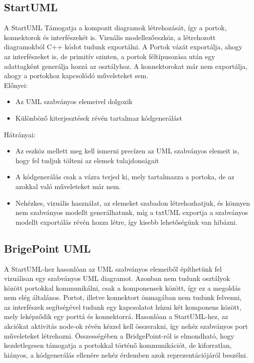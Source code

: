 \documentclass[a4paper,12pt]{report}
\begin{document}
\subsection{StartUML}
A StartUML  Támogatja a kompozit diagramok létrehozását, így a portok, konnektorok és interfészekét is. Vizuális modellezőeszköz, a létrehozott diagramokból C++ kódot tudunk exportálni. A Portok vázát exportálja, ahogy az interfészeket is, de primitív szinten, a portok féltípusozása után egy adattagként generálja hozzá az osztályhoz. A konnektorokat már nem exportálja, ahogy a portokhoz kapcsolódó műveleteket sem. \\
Előnyei:
\begin{itemize}
\item Az UML szabványos elemeivel dolgozik
\item Különböző kiterjesztések révén tartalmaz kódgenerálást
\end{itemize}
Hátrányai:
\begin{itemize}
\item Az eszköz mellett meg kell ismerni precízen az UML szabványos elemeit is, hogy fel tudjuk tölteni az elemek tulajdonságait
\item A kódgenerálás csak a vázra terjed ki, mely tartalmazza a portoka, de az azokkal való műveleteket már nem.
\item Nehézkes, vizuális használat, az elemeket szabadon létrehozhatjuk, és könnyen nem szabványos modellt generálhatunk, míg a txtUML exportja a szabványos modellt exportálás révén hozza létre, így kisebb lehetőségünk van hibázni.
\end{itemize}

\subsection{BrigePoint UML}
A StartUML-hez hasonlóan az UML szabványos elemeiből építhetünk fel vizuálisan egy szabványos UML diagramot. Azonban nem tudunk osztályok között portokkal kommunikálni, csak a komponensek között, így ez a megoldás nem elég általános. Portot, illetve konnektort önmagában nem tudunk felvenni, az interfészek segítségével tudunk egy kapcsolatot húzni két komponens között, mely leképződik egy porttá és konnektorrá. Hasonlóan a StartUML-hez, az akciókat aktivitás node-ok révén kézzel kell összerakni, így nehéz szabványos port műveleteket létrehozni. Összességében a BridgePoint-ról \cite{bridge} is elmondható, hogy kezdetlegesen támogatja a portokkal történő kommunikációt, de kiforratlan, hiányos, a kódgenerálás ellenére nehéz érdemben azok reprezentációjáról beszélni. 
\end{document}
